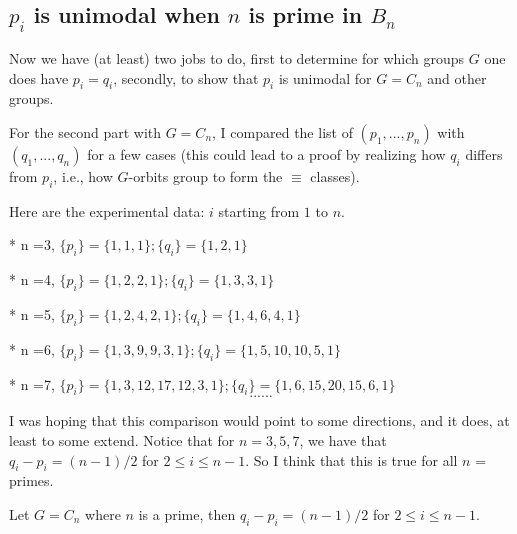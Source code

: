 \documentclass[12pt]{article}
\newcommand{\1}{\mathbb{I}}
\theoremstyle{definition}
\theoremstyle{definition}
\theoremstyle{definition}
\theoremstyle{definition}
\theoremstyle{definition}
\theoremstyle{definition}
\begin{document}
\subsection{$p_i$ is unimodal when $n$ is prime in $B_n$}

Now we have (at least) two jobs to do, first to determine for which groups $G$ one does have $p_i = q_i$, secondly, to show that $p_i$ is unimodal for $G = C_n$ and other groups. 

For the second part with $G = C_n$, I compared the list of $(p_1, ..., p_n)$ with $(q_1, ..., q_n)$ for a few cases (this could lead to a proof by realizing how $q_i$ differs from $p_i$, i.e., how $G$-orbits group to form the $\equiv$ classes). 


Here are the experimental data: $i$ starting from $1$ to $n$. 

* n =3, $\{ p_i \} = \{1 , 1, 1\}; \{q_i \} = \{1, 2, 1\}$ 

* n =4, $\{ p_i \} = \{1 , 2, 2, 1\}; \{q_i \} = \{1, 3, 3, 1\}$ 

* n =5, $\{ p_i \} = \{1 , 2, 4, 2, 1\}; \{q_i \} = \{1, 4, 6, 4, 1\}$ 

* n =6, $\{ p_i \} = \{1 , 3, 9, 9, 3, 1\}; \{q_i \} = \{1, 5, 10, 10, 5, 1\}$ 

* n =7, $\{ p_i \} = \{1 , 3, 12, 17, 12, 3, 1\}; \{q_i \} = \{1, 6, 15, 20, 15,6, 1\}$ 
$$...... $$

I was hoping that this comparison would point to some directions, and it does, at least to some extend. Notice that for $n= 3, 5, 7$, we have that $q_i - p_i = (n-1)/2$ for $ 2 \le i \le n-1$. So I  think that this is true for all $n$ = primes. 

\proposition Let $G = C_n$ where $n$ is a prime, then $q_i - p_i = (n-1)/2$ for $ 2 \le i \le n-1$. 
\end{document}
